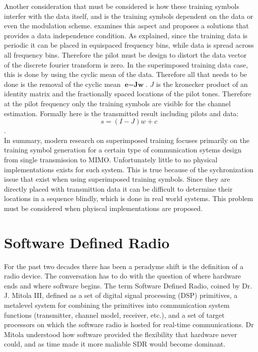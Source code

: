 \documentclass[11pt]{mvlthesis}
\begin{document}
Another consideration that must be considered is how these training symbols interfer with the data itself, and is the training symbols dependent on the data or even the modulation scheme.\cite{15} examines this aspect and proposes a solutions that provides a data independence condition.  As explained, since the training data is periodic it can be placed in equispaced frequency bins, while data is spread across all frequency bins.   Therefore the pilot must be design to distort the data vector of the discrete fourier transform is zero.  In the superimposed training data case, this is done by using the cyclic mean of the data.  Therefore all that needs to be done is the removal of the cyclic mean \(\textbf{e}=\textbf{Jw}\).  \(J\) is the kronecker product of an identity matrix and the fractionally spaced locations of the pilot tones.  Therefore at the pilot frequency only the training symbols are visible for the channel estimation.  Formally here is the transmitted result including pilots and data: \[ s= (I-J)w+c  \].\\


In summary, modern research on superimposed training focuses primarily on the training symbol generation for a certain type of communication sytems design from single transmission to MIMO.  Unfortunately little to no physical implementations exists for such system.  This is true because of the sychronization issue that exist when using superimposed training symbols.  Since they are directly placed with transmittion data it can be difficult to determine their locations in a sequence blindly, which is done in real world systems.  This problem must be considered when phyiscal implementations are proposed.\\

\section{Software Defined Radio}

For the past two decades there has been a peradyme shift is the definition of a radio device.  The conversation has to do with the question of where hardware ends and where software begins.  The term Software Defined Radio, coined by Dr. J. Mitola III,  defined as a set of digital signal processing (DSP) primitives, a metalevel system for combining the primitives into communication system functions (transmitter, channel model, receiver, etc.), and a set of target processors on which the software radio is hosted for real-time communications\cite{21}.  Dr Mitola understood how software provided the flexibility that hardware never could, and as time made it more maliable SDR would become dominant.   
\end{document}
